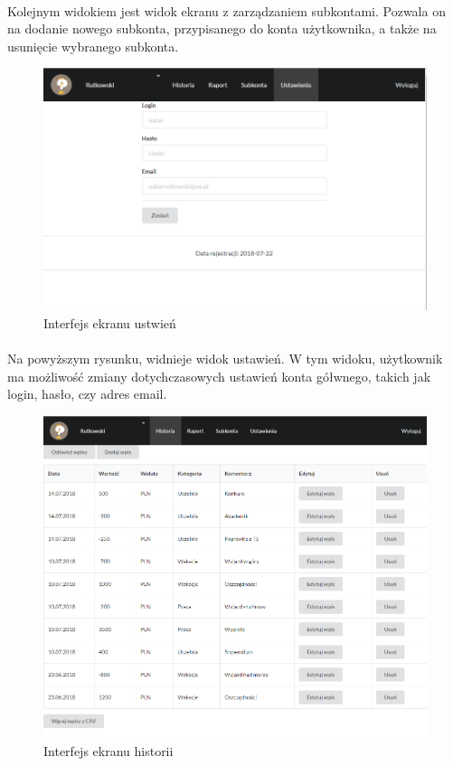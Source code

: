 \documentclass{article}
\begin{document}
\paragraph*{} Kolejnym widokiem jest widok ekranu z zarządzaniem subkontami. Pozwala on na dodanie nowego subkonta, przypisanego do konta użytkownika, a także na usunięcie wybranego subkonta.
\begin{figure}[H]
	\hspace*{-1.5cm}
	\includegraphics[scale=0.7]{assets/view5.png}
	\caption[]{Interfejs ekranu ustwień}
	\label{fig:ustawienia}
\end{figure}
\paragraph*{} Na powyższym rysunku, widnieje widok ustawień. W tym widoku, użytkownik ma możliwość zmiany dotychczasowych ustawień konta gółwnego, takich jak login, hasło, czy adres email.
\begin{figure}[H]
	\hspace*{-1cm}
	\includegraphics[scale=0.6]{assets/view6.png}
	\caption[]{Interfejs ekranu historii}
	\label{fig:historia}
\end{figure}
\end{document}
